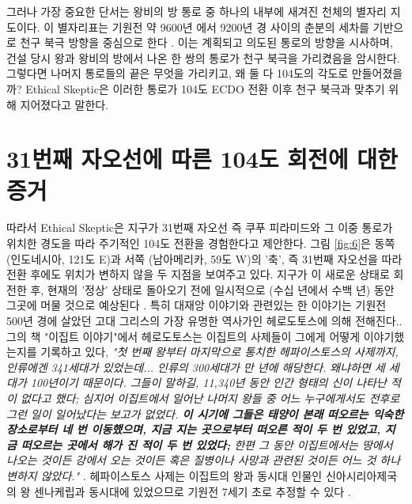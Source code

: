 \documentclass[10pt,twocolumn,letterpaper]{article}
\begin{document}
그러나 가장 중요한 단서는 왕비의 방 통로 중 하나의 내부에 새겨진 천체의 별자리 지도이다. 이 별자리표는  기원전 약 9600년 에서 9200년 경 사이의 춘분의 세차를 기반으로 천구 북극 방향을 중심으로 한다 \cite{28}. 이는 계획되고 의도된 통로의 방향을 시사하며, 건설 당시 왕과 왕비의 방에서 나온 한 쌍의 통로가 천구 북극을 가리켰음을 암시한다. 그렇다면 나머지 통로들의 끝은 무엇을 가리키고, 왜 둘 다 104도의 각도로 만들어졌을까? Ethical Skeptic은 이러한 통로가 104도 ECDO 전환 이후 천구 북극과 맞추기 위해 지어졌다고 말한다.

\section{31번째 자오선에 따른  104도 회전에 대한 증거}

따라서 Ethical Skeptic은 지구가 31번째 자오선 즉 쿠푸 피라미드와 그 이중 통로가 위치한 경도을 따라 주기적인 104도 전환을 경험한다고 제안한다. 그림 \ref{fig:6}은 동쪽 (인도네시아, 121도 E)과 서쪽 (남아메리카, 59도 W)의 '축', 즉 31번째 자오선을 따라 전환 후에도 위치가 변하지 않을 두 지점을 보여주고 있다. 지구가 이 새로운 상태로 회전한 후, 현재의 '정상' 상태로 돌아오기 전에 일시적으로 (수십 년에서 수백 년) 동안 그곳에 머물 것으로 예상된다 \cite{150}.
특히 대재앙 이야기와 관련있는 한 이야기는 기원전 500년 경에 살았던 고대 그리스의 가장 유명한 역사가인 헤로도토스에 의해 전해진다.\cite{31}. 그의 책 "이집트 이야기"에서 헤로도토스는 이집트의 사제들이 그에게 어떻게 이야기했는지를 기록하고 있다, \textit{"첫 번째 왕부터 마지막으로 통치한 헤파이스토스의 사제까지, 인류에겐  341세대가 있었는데... 인류의 300세대가 만 년에 해당한다. 왜냐하면 세 세대가 100년이기 때문이다. 그들이 말하길, 11,340년 동안 인간 형태의 신이 나타난 적이 없다고 했다; 심지어 이집트에서 일어난 나머지 왕들 중 어느 누구에게서도 전후로 그런 일이 일어났다는 보고가 없었다. \textbf{이 시기에 그들은 태양이 본래 떠오르는 익숙한 장소로부터 네 번 이동했으며, 지금 지는 곳으로부터 떠오른 적이 두 번 있었고, 지금 떠오르는 곳에서 해가 진 적이 두 번 있었다;} 한편 그 동안  이집트에서는 땅에서 나오는 것이든 강에서 오는 것이든 혹은 질병이나 사망과 관련된 것이든 어느 것 하나 변하지 않았다."} \cite{32}. 헤파이스토스 사제는 이집트의 왕과 동시대 인물인 신아시리아제국의 왕 센나케립과 동시대에 있었으므로 기원전 7세기 초로 추정할 수 있다 \cite{32,33,34}.
\end{document}
